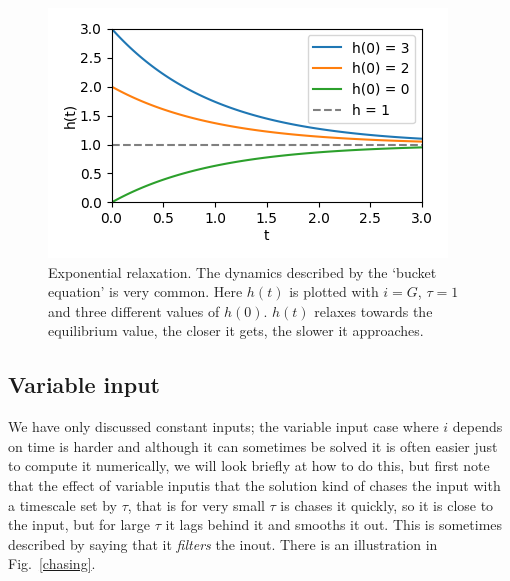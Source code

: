 \documentclass[11pt,a4paper]{scrartcl}
\begin{document}
\begin{figure}
\begin{center}
\includegraphics{relax.png}
\end{center}
\caption{Exponential relaxation. The dynamics described by the
  \lq{}bucket equation\rq{} is very common. Here
  $h(t)$ is plotted with
  $i=G$, $\tau=1$ and three different values of
  $h(0)$. $h(t)$ relaxes towards the equilibrium value, the closer it gets, the slower it approaches.\label{bucket_v}}
\end{figure}

\subsection*{Variable input}

We have only discussed constant inputs; the variable input case where
$i$ depends on time is harder and although it can sometimes be solved
it is often easier just to compute it numerically, we will look
briefly at how to do this, but first note that the effect of variable
inputis that the solution kind of chases the input with a timescale
set by $\tau$, that is for very small $\tau$ is chases it quickly, so
it is close to the input, but for large $\tau$ it lags behind it and
smooths it out. This is sometimes described by saying that it
\textsl{filters} the inout. There is an illustration in
Fig.~\ref{chasing}.
\end{document}

